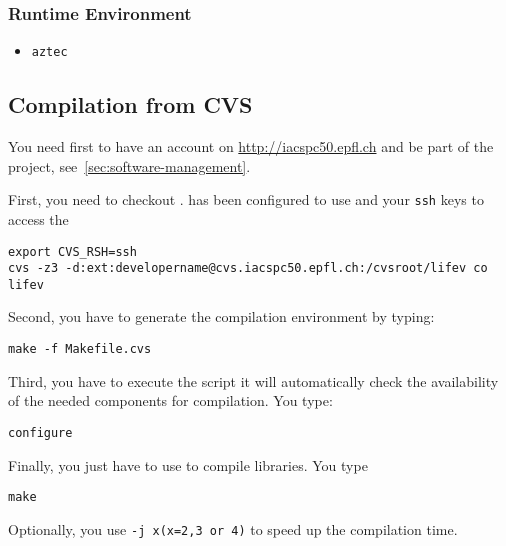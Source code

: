 \subsubsection{Runtime Environment}
\label{sec:runtime-env} 

\begin{itemize}
\item \verb!aztec!
\end{itemize} 

\subsection{Compilation from CVS}
\label{sec:compile-cvs} 
You need first to have an account on \url{http://iacspc50.epfl.ch} and
be part of the \lifev project, see~\ref{sec:software-management}. 

\noindent First, you need to checkout \lifev.  has
been configured to use  and your \verb!ssh! keys to
access the 

\begin{verbatim}
export CVS_RSH=ssh
cvs -z3 -d:ext:developername@cvs.iacspc50.epfl.ch:/cvsroot/lifev co lifev
\end{verbatim}

\noindent Second, you have to generate the compilation environment by typing:
\begin{verbatim}
make -f Makefile.cvs
\end{verbatim}

\noindent Third, you have to execute the script
it will automatically check the availability of the needed components
for \lifev compilation. You type: 

\begin{verbatim}
configure
\end{verbatim}

\noindent Finally, you just have to use  to compile \lifev libraries. You type
\begin{verbatim}
make 
\end{verbatim}
Optionally, you use \verb!-j x(x=2,3 or 4)! to speed up the compilation time.

